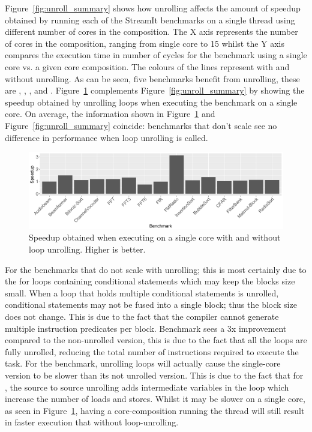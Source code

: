 Figure~\ref{fig:unroll_summary} shows how unrolling affects the amount of speedup obtained by running each of the StreamIt benchmarks on a single thread using different number of cores in the composition.
The X axis represents the number of cores in the composition, ranging from single core to 15 whilst the Y axis compares the execution time in number of cycles for the benchmark using a single core vs. a given core composition.
The colours of the lines represent with and without unrolling.
As can be seen, five benchmarks benefit from unrolling, these are , , ,  and . 
Figure~\ref{fig:unroll_bars} complements Figure~\ref{fig:unroll_summary} by showing the speedup obtained by unrolling loops when executing the benchmark on a single core.
On average, the information shown in Figure~\ref{fig:unroll_bars} and Figure~\ref{fig:unroll_summary} coincide: benchmarks that don't scale see no difference in performance when loop unrolling is called.

\begin{figure}[t]
  \includegraphics[width=1\textwidth]{streamit-paper/graphics/unroll_speed_bars.pdf}
   \vspace{-2em}
 \caption{Speedup obtained when executing on a single core with and without loop unrolling. Higher is better.}\label{fig:unroll_bars}
\end{figure}

For the benchmarks that do not scale with unrolling; this is most certainly due to the for loops containing conditional statements which may keep the blocks size small.
When a loop that holds multiple conditional statements is unrolled, conditional statements may not be fused into a single block; thus the block size does not change.
This is due to the fact that the compiler cannot generate multiple instruction predicates per block.
Benchmark  sees a 3x improvement compared to the non-unrolled version, this is due to the fact that all the loops are fully unrolled, reducing the total number of instructions required to execute the task.
For the  benchmark, unrolling loops will actually cause the single-core version to be slower than its not unrolled version.
This is due to the fact that for , the source to source unrolling adds intermediate variables in the loop which increase the number of loads and stores.
Whilst it may be slower on a single core, as seen in Figure~\ref{fig:unroll_bars}, having a core-composition running the thread will still result in faster execution that without loop-unrolling.

